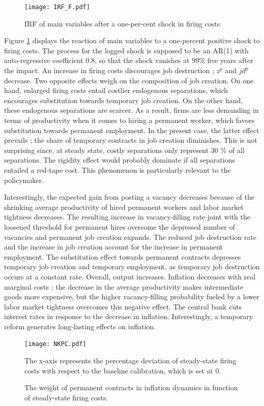 \documentclass[a4paper]{article}
\begin{document}
\begin{figure}[t]
\texttt{[image: IRF\_F.pdf]}
\caption{IRF of main variables after a one-per-cent shock in firing costs}
\label{IRF_F}
\end{figure}

Figure \ref{IRF_F} displays the reaction of main variables to a one-percent positive shock to firing costs. The process for the logged shock is supposed to be an AR(1) with auto-regressive coefficient 0.8, so that the shock vanishes at 99\% five years after the impact. An increase in firing costs discourages job destruction ; $z^p$ and $jd^p$ decrease. Two opposite effects weigh on the composition of job creation. On one hand, enlarged firing costs entail costlier endogenous separations, which encourages substitution towards temporary job creation. On the other hand, these endogenous separations are scarcer. As a result, firms are less demanding in terms of productivity when it comes to hiring a permanent worker, which favors substitution towards permanent employment. In the present case, the latter effect prevails ;  the share of temporary contracts in job creation diminishes. This is not surprising since, at steady state, costly separations only represent 30 \% of all separations. The rigidity effect would probably dominate if all separations entailed a red-tape cost. This phenomenon is particularly relevant to the policymaker.

Interestingly, the expected gain from posting a vacancy decreases because of the shrinking average productivity of hired permanent workers and labor market tightness decreases. The resulting increase in vacancy-filling rate joint with the loosened threshold for permanent hires overcome the depressed number of vacancies and permanent job creation expands. The reduced job destruction rate and the increase in job creation account for the increase in permanent employment. The substitution effect towards permanent contracts depresses temporary job creation and temporary employment, as temporary job destruction occurs at a constant rate. Overall, output increases. Inflation decreases with real marginal costs ; the decrease in the average productivity makes intermediate goods more expensive, but the higher vacancy-filling probability fueled by a lower labor market tightness overcomes this negative effect. The central bank cuts interest rates in response to the decrease in inflation. Interestingly, a temporary reform generates long-lasting effects on inflation.

\begin{figure}[t]
\texttt{[image: NKPC.pdf]}
\caption{The weight of permanent contracts in inflation dynamics in function of steady-state firing costs.}
\label{NKPC}
\footnotesize
\begin{flushleft}
The x-axis represents the percentage deviation of steady-state firing costs with respect to the baseline calibration, which is set at 0.
\end{flushleft}
\end{figure}
\end{document}
